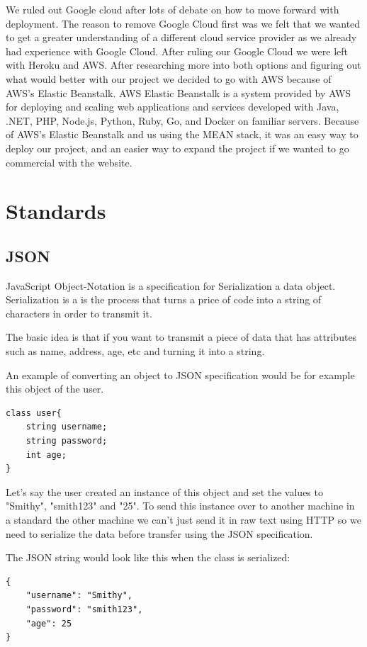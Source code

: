 We ruled out Google cloud after lots of debate on how to move forward with deployment. The reason to remove Google Cloud first was we felt that we wanted to get a greater understanding of a different cloud service provider as we already had experience with Google Cloud. After ruling our Google Cloud we were left with Heroku and AWS. After researching more into both options and figuring out what would better with our project we decided to go with AWS because of AWS's Elastic Beanstalk. AWS Elastic Beanstalk is a system provided by AWS for deploying and scaling web applications and services developed with Java, .NET, PHP, Node.js, Python, Ruby, Go, and Docker on familiar servers.  Because of AWS's Elastic Beanstalk and us using the MEAN stack, it was an easy way to deploy our project, and an easier way to expand the project if we wanted to go commercial with the website.

\section{Standards}
\subsection{JSON}
JavaScript Object-Notation is a specification for Serialization a data object. Serialization is a is the process that turns a price of code into a string of characters in order to transmit it. 

The basic idea is that if you want to transmit a piece of data that has attributes such as name, address, age, etc and turning it into a string.

An example of converting an object to JSON specification would be for example this object of the user.

\begin{verbatim}
class user{
    string username;
    string password;
    int age;
}
\end{verbatim}

Let's say the user created an instance of this object and set the values to "Smithy", "smith123" and "25". To send this instance over to another machine in a standard the other machine we can't just send it in raw text using HTTP so we need to serialize the data before transfer using the JSON specification. 

The JSON string would look like this when the class is serialized:
\begin{verbatim}
{
    "username": "Smithy",
    "password": "smith123",
    "age": 25
}
\end{verbatim}

